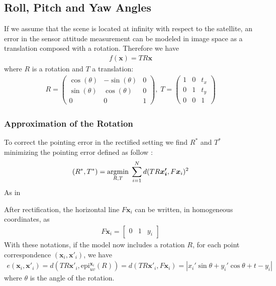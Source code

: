 \documentclass[paper=a4, fontsize=11pt, onecolumn, tikz, dvipsnames, svgnames, x11names]{article}
\begin{document}
\subsection{Roll, Pitch and Yaw Angles}
If we assume that the scene is located at infinity with respect to the satellite, an error in the sensor attitude measurement can be modeled in image space as a translation composed with a rotation. Therefore we have
\begin{align*}
f(\textbf{x}) = TR\textbf{x}
\end{align*}
where $R$ is a rotation and $T$ a translation:\\
\begin{align*}
R =
\begin{pmatrix}
\cos(\theta) & -\sin(\theta) & 0 \\
\sin(\theta) & \cos(\theta) & 0 \\
0 & 0 & 1
\end{pmatrix}, \;
T =
\begin{pmatrix}
1 & 0 & t_x \\
0 & 1 & t_y \\
0 & 0 & 1
\end{pmatrix}
\end{align*}

\subsubsection{Approximation of the Rotation}

To correct the pointing error in the rectified setting we find $R^*$ and $T^*$ minimizing the pointing error defined as follow :
\begin{align}
    (R^*, T^*) = \underset{R,T}{\operatorname{argmin}}\; \sum_{i=1}^N d(TR\bm{x_i'}, F\bm{x}_i)^2
\end{align}
As in~\cite{de2014b}

After rectification, the horizontal line $F\bm{x}_i$ can be written, in homogeneous coordinates, as
\begin{align*}
F\bm{x}_i =  \begin{bmatrix} 0 & 1 & y_i \end{bmatrix}
\end{align*}
With these notations, if the model now includes a rotation $R$, for each point correspondence $(\bm{x}_i , \bm{x}'_i)$, we have
\begin{align*}
e(\textbf{x}_i, \textbf{x}'_i) = d(TR\bm{x}'_i, \text{epi}^{\bm{x}_i}_{u v}(R)) = d(TR\bm{x}'_i, F\bm{x}_i) = |x_i' \sin \theta   + y_i' \cos \theta  + t - y_i |
\end{align*}
where $\theta$ is the angle of the rotation.
\end{document}

